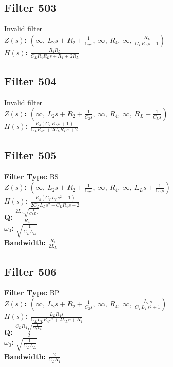 \documentclass{article}
\begin{document}
\subsection*{Filter 503}
Invalid filter \\ 
\textbf{$Z(s)$:} $\left( \infty, \  L_{2} s + R_{2} + \frac{1}{C_{2} s}, \  \infty, \  R_{4}, \  \infty, \  \frac{R_{L}}{C_{L} R_{L} s + 1}\right)$ \\ 
\textbf{$H(s)$:} $\frac{R_{4} R_{L}}{C_{L} R_{4} R_{L} s + R_{4} + 2 R_{L}}$ \\ 
\subsection*{Filter 504}
Invalid filter \\ 
\textbf{$Z(s)$:} $\left( \infty, \  L_{2} s + R_{2} + \frac{1}{C_{2} s}, \  \infty, \  R_{4}, \  \infty, \  R_{L} + \frac{1}{C_{L} s}\right)$ \\ 
\textbf{$H(s)$:} $\frac{R_{4} \left(C_{L} R_{L} s + 1\right)}{C_{L} R_{4} s + 2 C_{L} R_{L} s + 2}$ \\ 
\subsection*{Filter 505}
\textbf{Filter Type:} BS \\ 
\textbf{$Z(s)$:} $\left( \infty, \  L_{2} s + R_{2} + \frac{1}{C_{2} s}, \  \infty, \  R_{4}, \  \infty, \  L_{L} s + \frac{1}{C_{L} s}\right)$ \\ 
\textbf{$H(s)$:} $\frac{R_{4} \left(C_{L} L_{L} s^{2} + 1\right)}{2 C_{L} L_{L} s^{2} + C_{L} R_{4} s + 2}$ \\ 
\textbf{Q:} $\frac{2 L_{L} \sqrt{\frac{1}{C_{L} L_{L}}}}{R_{4}}$ \\ 
\textbf{$\omega_0$:} $\sqrt{\frac{1}{C_{L} L_{L}}}$ \\ 
\textbf{Bandwidth:} $\frac{R_{4}}{2 L_{L}}$ \\ 
\subsection*{Filter 506}
\textbf{Filter Type:} BP \\ 
\textbf{$Z(s)$:} $\left( \infty, \  L_{2} s + R_{2} + \frac{1}{C_{2} s}, \  \infty, \  R_{4}, \  \infty, \  \frac{L_{L} s}{C_{L} L_{L} s^{2} + 1}\right)$ \\ 
\textbf{$H(s)$:} $\frac{L_{L} R_{4} s}{C_{L} L_{L} R_{4} s^{2} + 2 L_{L} s + R_{4}}$ \\ 
\textbf{Q:} $\frac{C_{L} R_{4} \sqrt{\frac{1}{C_{L} L_{L}}}}{2}$ \\ 
\textbf{$\omega_0$:} $\sqrt{\frac{1}{C_{L} L_{L}}}$ \\ 
\textbf{Bandwidth:} $\frac{2}{C_{L} R_{4}}$ \\ 
\end{document}
